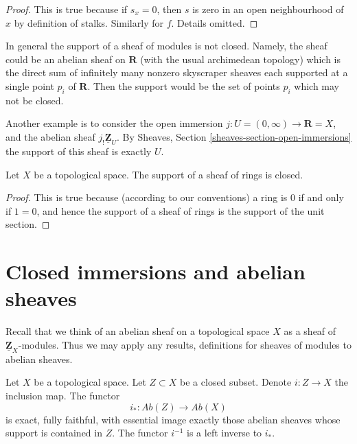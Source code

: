 \begin{proof}
This is true because if $s_x = 0$, then $s$ is zero
in an open neighbourhood of $x$ by definition of stalks.
Similarly for $f$. Details omitted.
\end{proof}

\noindent
In general the support of a sheaf of modules is not closed.
Namely, the sheaf could be an abelian sheaf on $\mathbf{R}$
(with the usual archimedean topology)
which is the direct sum of infinitely many nonzero skyscraper
sheaves each supported at a single point $p_i$ of $\mathbf{R}$.
Then the support would be the set of points $p_i$
which may not be closed.

\medskip\noindent
Another example is to consider the open immersion
$j : U = (0 , \infty) \to \mathbf{R} = X$, and the abelian sheaf
$j_!\underline{\mathbf{Z}}_U$. By Sheaves, Section
\ref{sheaves-section-open-immersions} the support of
this sheaf is exactly $U$.

\begin{lemma}
\label{lemma-support-sheaf-rings-closed}
Let $X$ be a topological space.
The support of a sheaf of rings is closed.
\end{lemma}

\begin{proof}
This is true because (according to our conventions)
a ring is $0$ if and only if
$1 = 0$, and hence the support of a sheaf of rings
is the support of the unit section.
\end{proof}






\section{Closed immersions and abelian sheaves}
\label{section-closed-immersions}

\noindent
Recall that we think of an abelian sheaf on a topological space $X$ as a
sheaf of $\underline{\mathbf{Z}}_X$-modules. Thus we may apply any results,
definitions for sheaves of modules to abelian sheaves.

\begin{lemma}
\label{lemma-i-star-exact}
Let $X$ be a topological space. Let $Z \subset X$ be a closed subset.
Denote $i : Z \to X$ the inclusion map. The functor
$$
i_* : \textit{Ab}(Z) \longrightarrow \textit{Ab}(X)
$$
is exact, fully faithful, with essential image exactly those
abelian sheaves whose support is contained in $Z$. The functor $i^{-1}$
is a left inverse to $i_*$.
\end{lemma}

